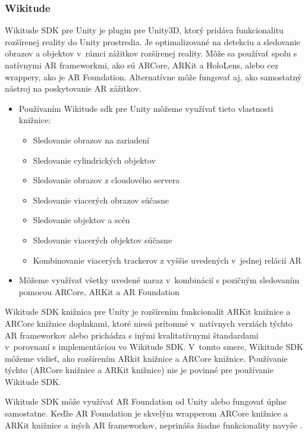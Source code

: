 \subsubsection{Wikitude}

Wikitude SDK pre Unity je plugin pre Unity3D, ktorý pridáva funkcionalitu rozšírenej reality do Unity prostredia. Je optimalizované na detekciu a sledovanie obrazov a objektov v~rámci zážitkov rozšírenej reality. Môže sa používať spolu s natívnymi AR frameworkmi, ako sú ARCore, ARKit a HoloLens, alebo cez wrappery, ako je AR Foundation. Alternatívne môže fungovať aj, ako samostatný nástroj na poskytovanie AR zážitkov.

\begin{itemize}
    \item Používaním Wikitude \gls{sdk} pre Unity môžeme využívať tieto vlastnosti knižnice:
    \begin{itemize}
        \item Sledovanie obrazov na zariadení
        \item Sledovanie cylindrických objektov
        \item Sledovanie obrazov z cloudového servera
        \item Sledovanie viacerých obrazov súčasne
        \item Sledovanie objektov a scén
        \item Sledovanie viacerých objektov súčasne
        \item Kombinovanie viacerých trackerov z vyššie uvedených v~jednej relácií AR
    \end{itemize}
    \item Môžeme využívať všetky uvedené naraz v~kombinácií s pozičným sledovaním pomocou ARCore, ARKit a AR Foundation
\end{itemize}

Wikitude SDK knižnica pre Unity je rozšírením funkcionalít ARKit knižnice a ARCore knižnice doplnkami, ktoré niesú prítomné v~natívnych verziách týchto AR frameworkov alebo prichádza s inými kvalitatívnymi štandardami v~porovnaní s implementáciou vo Wikitude SDK. V~tomto smere, Wikitude SDK môžeme vidieť, ako rozšírením ARkit knižnice a ARCore knižnice. Používanie týchto (ARCore knižnice a ARKit knižnice) nie je povinné pre používanie Wikitude SDK.

Wikitude SDK môže využívať AR Foundation od Unity alebo fungovať úplne samostatne. Keďže AR Foundation je skvelým wrapperom ARCore knižnice a ARKit knižnice a iných AR frameworkov, neprináša žiadne funkcionality navyše \cite{wikitude2023sdk}. 

